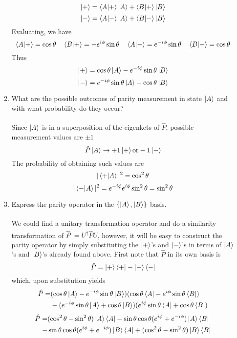 \documentclass[11pt,letterpaper]{article}
\begin{document}
\begin{enumerate}
\begin{enumerate}
  $$\ket + = \braket{A|+}\ket A + \braket{B|+}\ket B$$
  $$\ket - = \braket{A|-}\ket A + \braket{B|-}\ket B$$
 Evaluating, we have
 $$\braket{A|+} = \cos\theta \quad \braket{B|+}=-e^{i\phi}\sin\theta\quad \braket{A|-}=e^{-i\phi}\sin\theta\quad \braket{B|-}=\cos\theta$$
 Thus
 $$\ket + = \cos\theta\ket A -e^{-i\phi}\sin\theta\ket B$$
 $$\ket - = e^{-i\phi}\sin\theta\ket A + \cos\theta\ket B$$
\item What are the possible outcomes of parity measurement in state $\ket A$ and with what probability do they occur?
\\ \\Since $\ket A$ is in a superposition of the eigenkets of $\hat P$, possible measurement values are $\pm 1$
$$\hat P\ket A \rightarrow +1\ket + \text{or} -1\ket -$$
The probability of obtaining such values are 
$$|\braket{+|A}|^2 =\cos^2\theta$$ $$|\braket{-|A}|^2=e^{-i\phi}e^{i\phi}\sin^2\theta=\sin^2\theta$$
\item Express the parity operator in the $\{\ket A,\ket B\}$ basis.
\\ \\We could find a unitary transformation operator and do a similarity transformation of $\hat P^\prime = U^\dag \hat PU$, however, it will be easy to construct the parity operator by simply substituting the $\ket +$'s and $\ket -$'s in terms of $\ket A$'s and $\ket B$'s already found above. First note that $\hat P$ in its own basis is
$$\hat P = \ket +\bra + -\ket -\bra-$$
which, upon substitution yields
\begin{align*}\hat P = &(\cos\theta\ket A-e^{-i\phi}\sin\theta\ket B)(\cos\theta\bra A-e^{i\phi}\sin\theta\bra B)\\&-(e^{-i\phi}\sin\theta\ket A + \cos\theta\ket B)(e^{i\phi}\sin\theta\bra A+\cos\theta\bra B)\end{align*}
\begin{align*}\hat P =&(\cos^2\theta -\sin^2\theta)\ket A\bra A -\sin\theta\cos\theta(e^{i\phi}+e^{-i\phi}) \ket A \bra B
\\-&\sin\theta\cos\theta(e^{i\phi}+e^{-i\phi})\ket B\bra A +(\cos^2\theta-\sin^2\theta)\ket B\bra B\end{align*}

\end{enumerate}


\end{enumerate}
\end{document}
